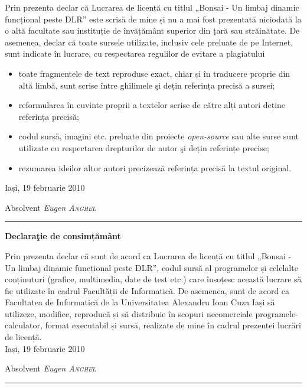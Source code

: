 \documentclass[12pt,a4paper]{memoir}
\begin{document}
Prin prezenta declar că Lucrarea de licență cu titlul „Bonsai - Un limbaj dinamic funcțional peste DLR” este scrisă de mine și nu a mai fost prezentată niciodată la o altă facultate sau instituție de învățământ superior din țară sau străinătate. De asemenea, declar că toate sursele utilizate, inclusiv cele preluate de pe Internet, sunt indicate în lucrare, cu respectarea regulilor de evitare a plagiatului
\begin{itemize}
\item toate fragmentele de text reproduse exact, chiar și în traducere proprie din altă limbă, sunt scrise între ghilimele şi dețin referința precisă a sursei;
\item reformularea în cuvinte proprii a textelor scrise de către alți autori deține referința precisă;
\item codul sursă, imagini etc. preluate din proiecte \emph{open-source} sau alte surse sunt utilizate cu respectarea drepturilor de autor şi dețin referințe precise;
\item rezumarea ideilor altor autori precizează referința precisă la textul original.
\end{itemize}
\vspace{2cm}
Iași, 19 februarie 2010
\\[1cm]
\begin{flushright}
Absolvent \emph{Eugen \textsc{Anghel}}\\[1.4cm]
\rule{0.31\linewidth}{0.2mm}
\end{flushright}

\cleardoublepage
\thispagestyle{empty}
\begin{centering}
\LARGE{\textbf{Declaraţie de consimțământ}}
\end{centering}

\vspace{2cm}

Prin prezenta declar că sunt de acord ca Lucrarea de licență cu titlul „Bonsai - Un limbaj dinamic funcțional peste DLR”, codul sursă al programelor și celelalte conținuturi (grafice, multimedia, date de test etc.) care însoțesc această lucrare să fie utilizate în cadrul Facultății de Informatică. De asemenea, sunt de acord ca Facultatea de Informatică de la Universitatea Alexandru Ioan Cuza Iași să utilizeze, modifice, reproducă și să distribuie în scopuri necomerciale programele-calculator, format executabil și sursă, realizate de mine în cadrul prezentei lucrări de licență.
\\[2cm]
Iași, 19 februarie 2010
\\[1cm]
\begin{flushright}
Absolvent \emph{Eugen \textsc{Anghel}}\\[1.4cm]
\rule{0.31\linewidth}{0.2mm}
\end{flushright}
\cleardoublepage
\end{document}

